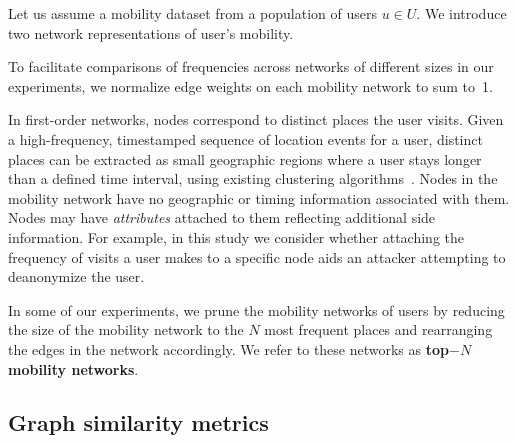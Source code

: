 Let us assume a mobility dataset from a population of users $ u \in U$.
We introduce two network representations of user's mobility.



\vspace{.4cm}
To facilitate comparisons of frequencies across networks of different sizes in our experiments, we normalize edge weights on each mobility network to sum \mbox{to 1}.

In first-order networks, nodes correspond to distinct places the user visits.
Given a high-frequency, timestamped sequence of location events for a user, distinct places can be extracted as small geographic regions where a user stays longer than a defined time interval, using existing clustering algorithms~\cite{kang2005extracting}.
Nodes in the mobility network have no geographic or timing information associated with them.
Nodes may have \emph{attributes} attached to them reflecting additional side information.
For example, in this study we consider whether attaching the frequency of visits a user makes to a specific node aids an attacker attempting to deanonymize the user.

In some of our experiments, we prune the mobility networks of users by reducing the size of the mobility network to the $ N $ most frequent places and rearranging the edges in the network accordingly.
We refer to these networks as \textbf{top$-N $ mobility networks}.

\subsection{Graph similarity metrics\label{sec:graph-kernels}}

